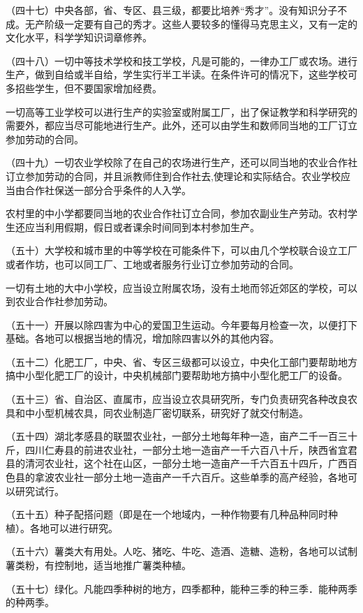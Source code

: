 （四十七）中央各部，省、专区、县三级，都要比培养“秀才”。没有知识分子不成。无产阶级一定要有自己的秀才。这些人要较多的懂得马克思主义，又有一定的文化水平，科学学知识词章修养。

（四十八）一切中等技术学校和技工学校，凡是可能的，一律办工厂或农场。进行生产，做到自给或半自给，学生实行半工半读。在条件许可的情况下，这些学校可多招些学生，但不要国家增加经费。

一切高等工业学校可以进行生产的实验室或附属工厂，出了保证教学和科学研究的需要外，都应当尽可能地进行生产。此外，还可以由学生和数师同当地的工厂订立参加劳动的合同。

（四十九）一切农业学校除了在自己的农场进行生产，还可以同当地的农业合作社订立参加劳动的合同，并且派教师住到合作社去,使理论和实际结合。农业学校应当由合作社保送一部分合乎条件的人入学。

农村里的中小学都要同当地的农业合作社订立合同，参加农副业生产劳动。农村学生还应当利用假期，假日或者课余时间同到本村参加生产。

（五十）大学校和城市里的中等学校在可能条件下，可以由几个学校联合设立工厂或者作坊，也可以同工厂、工地或者服务行业订立参加劳动的合同。

一切有土地的大中小学校，应当设立附属农场，没有土地而邻近郊区的学校，可以到农业合作社参加劳动。

（五十一）开展以除四害为中心的爱国卫生运动。今年要每月检查一次，以便打下基础。各地可以根据当地的情况，增加除四害以外的其他内容。

（五十二）化肥工厂，中央、省、专区三级都可以设立，中央化工部门要帮助地方搞中小型化肥工厂的设计，中央机械部门要帮助地方搞中小型化肥工厂的设备。

（五十三）省、自治区、直属市，应当设立农具研究所，专门负责研究各种改良农具和中小型机械农具，同农业制造厂密切联系，研究好了就交付制造。

（五十四）湖北孝感县的联盟农业社，一部分土地每年种一造，亩产二千一百三十斤，四川仁寿县的前进农业社，一部分土地一造亩产一千六百八十斤，陕西省宜君县的清河农业社，这个社在山区，一部分土地一造亩产一千六百五十四斤，广西百色县的拿波农业社一部分土地一造亩产一千六百斤。这些单季的高产经验，各地可以研究试行。

（五十五）种子配搭问题（即是在一个地域内，一种作物要有几种品种同时种植）。各地可以进行研究。

（五十六）薯类大有用处。人吃、猪吃、牛吃、造酒、造糖、造粉，各地可以试制薯类粉，有控制地，适当地推广薯类种植。

（五十七）绿化。凡能四季种树的地方，四季都种，能种三季的种三季．能种两季的种两季。

